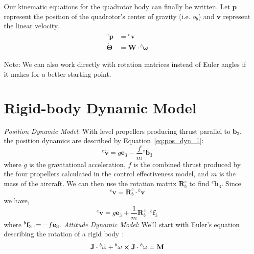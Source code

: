 \documentclass{article}
\newcommand{\defeq}{\vcentcolon=}
\begin{document}
		Our kinematic equations for the quadrotor body can finally be written.  Let $\mathbf{p}$ represent the position of the quadrotor's center of gravity (i.e. $o_b$)  and $\mathbf{v}$ represent the linear velocity.  
		\begin{align}
			\begin{split}
				{}^e \dot{\mathbf{p}} &= {}^e \mathbf{v} \\
				\dot{\mathbf{\Theta}} &= \mathbf{W} \cdot {}^b\mathbf{\omega}
			\end{split}
			\label{eq:kinematic_equations}
		\end{align}
	
		Note: We can also work directly with rotation matrices instead of Euler angles if it makes for a better starting point.  
	\section*{Rigid-body Dynamic Model}
	\textit{Position Dynamic Model}:
	With level propellers producing thrust parallel to $\mathbf{b}_3$, the position dynamics are described by Equation~\ref{eq:pos_dyn_1}:
	\begin{equation}
		{}^e\dot{\mathbf{v}} = g \mathbf{e}_3 - \frac{f}{m}{}^e\mathbf{b}_3
		\label{eq:pos_dyn_1}
	\end{equation}
	where $g$ is the gravitational acceleration, $f$ is the combined thrust produced by the four propellers calculated in the control effectiveness model, and $m$ is the mass of the aircraft.  We can then use the rotation matrix $\mathbf{R}_b^e$ to find ${}^e\mathbf{b}_3$.  Since
	\begin{equation}
		{}^e \mathbf{v} =\mathbf{R}_b^e \cdot {}^b\mathbf{v}
		\label{eq:pos_dyn_2}
	\end{equation}
	we have,
	\begin{equation}
		{}^e\dot{\mathbf{v}} = g \mathbf{e}_3 + \frac{1}{m}\mathbf{R}_b^e\cdot{}^b\mathbf{f}_3
		\label{eq:pos_dyn_final}
	\end{equation}
	where ${}^b\mathbf{f}_3 \defeq -f\mathbf{e}_3$.
	\newline \newline \textit{Attitude Dynamic Model}:  We'll start with Euler's equation describing the rotation of a rigid body \cite{ClassicalDynamicsParticles1965}: 
	\begin{equation}
		\mathbf{J} \cdot {}^b\dot{\mathbf{\omega}} + {}^b\mathbf{\omega} \cross \mathbf{J}\cdot{}^b\mathbf{\omega}= \mathbf{M}
		\label{eq:euler_eqn}
	\end{equation}
\end{document}
